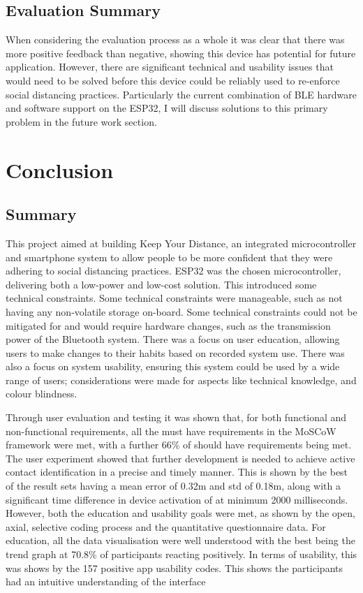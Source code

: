 \documentclass{l4proj}
\begin{document}
\section{Evaluation Summary}

When considering the evaluation process as a whole it was clear that there was more positive feedback than negative, showing this device has potential for future application. However, there are significant technical and usability issues that would need to be solved before this device could be reliably used to re-enforce social distancing practices. Particularly the current combination of BLE hardware and software support on the ESP32, I will discuss solutions to this primary problem in the future work section.

\chapter{Conclusion}

\section{Summary}

This project aimed at building Keep Your Distance, an integrated microcontroller and smartphone system to allow people to be more confident that they were adhering to social distancing practices. ESP32 was the chosen microcontroller, delivering both a low-power and low-cost solution. This introduced some technical constraints. Some technical constraints were manageable, such as not having any non-volatile storage on-board. Some technical constraints could not be mitigated for and would require hardware changes, such as the transmission power of the Bluetooth system. There was a focus on user education, allowing users to make changes to their habits based on recorded system use. There was also a focus on system usability, ensuring this system could be used by a wide range of users; considerations were made for aspects like technical knowledge, and colour blindness.

Through user evaluation and testing it was shown that, for both functional and non-functional requirements, all the must have requirements in the MoSCoW framework were met, with a further 66\% of should have requirements being met. The user experiment showed that further development is needed to achieve active contact identification in a precise and timely manner. This is shown by the best of the result sets having a mean error of 0.32m and std of 0.18m, along with a significant time difference in device activation of at minimum 2000 milliseconds. However, both the education and usability goals were met, as shown by the open, axial, selective coding process and the quantitative questionnaire data. For education, all the data visualisation were well understood with the best being the trend graph at 70.8\% of participants reacting positively. In terms of usability, this was shows by the 157 positive app usability codes. This shows the participants had an intuitive understanding of the interface
\end{document}
